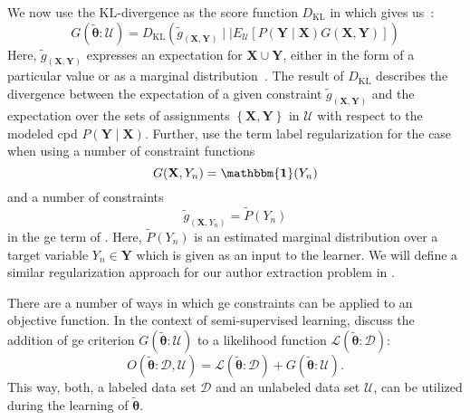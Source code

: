 We now use the $\text{KL}$-divergence as the score function $D_{\text{KL}}$ in  which gives us~\citep{mann2010generalized}:
\begin{equation}
  \label{equ:generalized-expectation-kl}
  G(\bm{\tilde{\theta}}:\mathcal{U})=D_{\text{KL}}\left(\tilde{g}_{\left(\mathbf{X},\mathbf{Y}\right)}\mid\mid E_{\mathcal{U}}\left[P(\mathbf{Y}\mid\mathbf{X})G(\mathbf{X},\mathbf{Y})\right]\right)
\end{equation}
Here, $\tilde{g}_{\left(\mathbf{X},\mathbf{Y}\right)}$ expresses an expectation for $\mathbf{X}\cup\mathbf{Y}$, either in the form of a particular value or as a \gls{marginal distribution}~\citep{mann2010generalized}.
The result of $D_{\text{KL}}$ describes the divergence between the expectation of a given constraint $\tilde{g}_{\left(\mathbf{X},\mathbf{Y}\right)}$ and the expectation over the sets of assignments $\left\{\mathbf{X},\mathbf{Y}\right\}$ in $\mathcal{U}$ with respect to the modeled \gls{cpd} $P(\mathbf{Y}\mid\mathbf{X})$.
Further, \citet{mann2010generalized} use the term \gls{label regularization} for the case when using a number of constraint functions
\begin{equation}
  \label{equ:label-regularization-constraint-function}
  G(\mathbf{X},Y_n)=\mathbf{\mathbbm{1}}(Y_n)
\end{equation}
and a number of constraints
\begin{equation}
  \label{equ:label-regularization-constraints}
  \tilde{g}_{\left(\mathbf{X},Y_n\right)}=\tilde{P}(Y_n)
\end{equation}
in the \gls{ge} term of .
Here, $\tilde{P}(Y_n)$ is an estimated \gls{marginal distribution} over a \gls{target variable} $Y_n\in\mathbf{Y}$ which is given as an input to the learner.
We will define a similar regularization approach for our author extraction problem in .

\bigskip

There are a number of ways in which \gls{ge} constraints can be applied to an \gls{objective function}.
In the context of semi-supervised learning, \citet{mann2010generalized} discuss the addition of \gls{ge} criterion $G(\bm{\tilde{\theta}}:\mathcal{U})$ to a likelihood function $\mathcal{L}(\bm{\tilde{\theta}}:\mathcal{D})$:
\begin{equation}
  \label{equ:objective-function-l-g}
  O(\bm{\tilde{\theta}}:\mathcal{D},\mathcal{U})=\mathcal{L}(\bm{\tilde{\theta}}:\mathcal{D})+G(\bm{\tilde{\theta}}:\mathcal{U}).
\end{equation}
This way, both, a labeled data set $\mathcal{D}$ and an unlabeled data set $\mathcal{U}$, can be utilized during the learning of $\bm{\tilde{\theta}}$.

